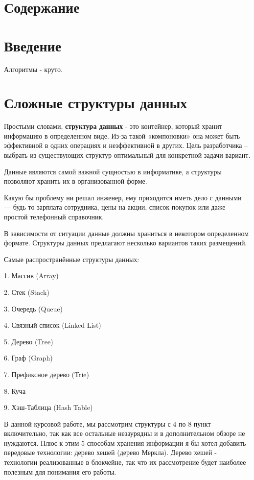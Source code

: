 \documentclass[utf8,14pt,a4paper,oneside,russian]{book}
\makeatletter
\renewcommand{\tableofcontents}{\section*{Содержание}\markboth{Содержание}{}\@starttoc{toc}\newpage}
\makeatother
\begin{document}
	\tableofcontents
	
	\section{Введение}
	
	Алгоритмы - круто.
	
	\newpage
	\section{Сложные структуры данных}
	
	Простыми словами, \textbf{структура данных} - это контейнер, который хранит информацию в определенном виде. Из-за такой «компоновки» она может быть эффективной в одних операциях и неэффективной в других. Цель разработчика – выбрать из существующих структур оптимальный для конкретной задачи вариант.
	
	Данные являются самой важной сущностью в информатике, а структуры позволяют хранить их в организованной форме.
	
	Какую бы проблему ни решал инженер, ему приходится иметь дело с данными — будь то зарплата сотрудника, цены на акции, список покупок или даже простой телефонный справочник.
	
	В зависимости от ситуации данные должны храниться в некотором определенном формате. Структуры данных предлагают несколько вариантов таких размещений.
	
	Самые распространённые структуры данных:
	
	
	1. Массив (Array)
	
	2. Стек (Stack)
	
	3. Очередь (Queue)
	
	4. Связный список (Linked List)
	
	5. Дерево (Tree)
	
	6. Граф (Graph)
	
	7. Префиксное дерево (Trie)
	
	8. Куча
	
	9. Хэш-Таблица (Hash Table)
	
	В данной курсовой работе, мы рассмотрим структуры с 4 по 8 пункт включительно, так как все остальные незаурядны и  в дополнительном обзоре не нуждаются. Плюс к этим 5 способам хранения информации я бы хотел добавить передовые технологии: дерево хешей (дерево Меркла). Дерево хешей - технологии реализованные в блокчейне, так что их рассмотрение будет наиболее полезным для понимания его работы.
	
\end{document}
